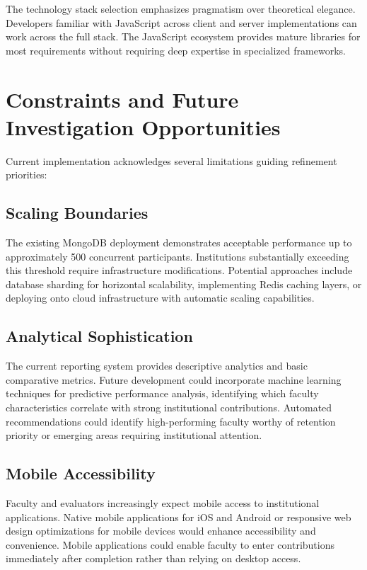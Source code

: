 \documentclass[conference]{IEEEtran}
\begin{document}
The technology stack selection emphasizes pragmatism over theoretical elegance. Developers familiar with JavaScript across client and server implementations can work across the full stack. The JavaScript ecosystem provides mature libraries for most requirements without requiring deep expertise in specialized frameworks.

\section{Constraints and Future Investigation Opportunities}
\label{sec:limitations}

Current implementation acknowledges several limitations guiding refinement priorities:

\subsection{Scaling Boundaries}
The existing MongoDB deployment demonstrates acceptable performance up to approximately 500 concurrent participants. Institutions substantially exceeding this threshold require infrastructure modifications. Potential approaches include database sharding for horizontal scalability, implementing Redis caching layers, or deploying onto cloud infrastructure with automatic scaling capabilities.

\subsection{Analytical Sophistication}
The current reporting system provides descriptive analytics and basic comparative metrics. Future development could incorporate machine learning techniques for predictive performance analysis, identifying which faculty characteristics correlate with strong institutional contributions. Automated recommendations could identify high-performing faculty worthy of retention priority or emerging areas requiring institutional attention.

\subsection{Mobile Accessibility}
Faculty and evaluators increasingly expect mobile access to institutional applications. Native mobile applications for iOS and Android or responsive web design optimizations for mobile devices would enhance accessibility and convenience. Mobile applications could enable faculty to enter contributions immediately after completion rather than relying on desktop access.
\end{document}
